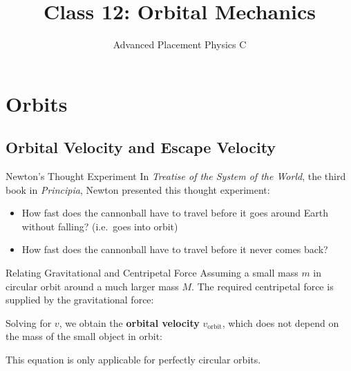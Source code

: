 \documentclass[12pt,compress,aspectratio=169]{beamer}
\title{Class 12: Orbital Mechanics}
\subtitle{Advanced Placement Physics C}
\begin{document}
\begin{frame}
  \maketitle
\end{frame}


\section{Orbits}

\subsection{Orbital Velocity and Escape Velocity}

\begin{frame}{Newton's Thought Experiment}
  In \emph{Treatise of the System of the World}, the third book in
  \emph{Principia}, Newton presented this thought experiment:
  \begin{center}
  \end{center}
  \begin{itemize}
  \item How fast does the cannonball have to travel before it goes around Earth
    without falling? (i.e.\ goes into orbit)
  \item How fast does the cannonball have to travel before it never comes back?
  \end{itemize}
\end{frame}



\begin{frame}{Relating Gravitational and Centripetal Force}
  Assuming a small mass $m$ in circular orbit around a much larger mass $M$.
  The required centripetal force is supplied by the gravitational force:
  

  \vspace{-.1in}Solving for $v$, we obtain the \textbf{orbital velocity}
  $v_\text{orbit}$, which does not depend on the mass of the small object in
  orbit:


  \vspace{-.1in}This equation is only applicable for perfectly circular orbits.
\end{frame}
\end{document}
